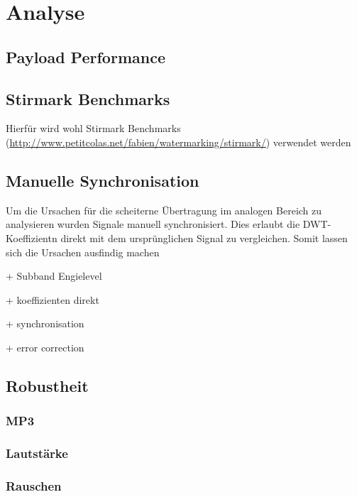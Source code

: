 \chapter{Analyse}
\label{ch:analyse}



\section{Payload Performance}
\label{sec:payloadperformance}

\section{Stirmark Benchmarks}

Hierfür wird wohl Stirmark Benchmarks\cite{petitcolas2000watermarking}\cite{petitcolas2004stirmark} (\url{http://www.petitcolas.net/fabien/watermarking/stirmark/}) verwendet werden

\section{Manuelle Synchronisation}

Um die Ursachen für die scheiterne Übertragung im analogen Bereich zu analysieren wurden Signale manuell synchronisiert. Dies erlaubt die DWT-Koeffizientn direkt mit dem ursprünglichen Signal zu vergleichen. Somit lassen sich die Ursachen ausfindig machen

+ Subband Engielevel

+ koeffizienten direkt

+ synchronisation

+ error correction

\section{Robustheit}

\subsection{MP3}

\subsection{Lautstärke}

\subsection{Rauschen}

